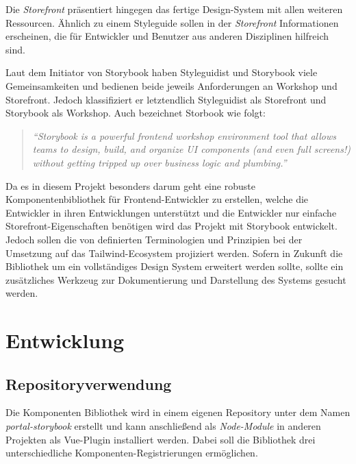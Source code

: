 Die \textit{Storefront} präsentiert hingegen das fertige Design-System mit allen weiteren Ressourcen. Ähnlich zu einem Styleguide sollen in der \textit{Storefront} Informationen erscheinen, die für Entwickler und Benutzer aus anderen Disziplinen hilfreich sind.

Laut \cite{StorybookVSStyleguidist} dem Initiator von Storybook haben Styleguidist und Storybook viele Gemeinsamkeiten und bedienen beide jeweils Anforderungen an Workshop und Storefront. Jedoch klassifiziert er letztendlich Styleguidist als Storefront und Storybook als Workshop. Auch \cite{FrostCite} bezeichnet Storbook wie folgt:
\begin{quotation}
    \emph{``Storybook is a powerful frontend workshop environment tool that allows teams to design, build, and organize UI components (and even full screens!) without getting tripped up over business logic and plumbing.''}
\end{quotation}
Da es in diesem Projekt besonders darum geht eine robuste Komponentenbibliothek für Frontend-Entwickler zu erstellen, welche die Entwickler in ihren Entwicklungen unterstützt und die Entwickler nur einfache Storefront-Eigenschaften benötigen wird das Projekt mit Storybook entwickelt. Jedoch sollen die von \citep{VueDesignSystemTerminology} definierten Terminologien und Prinzipien bei der Umsetzung auf das Tailwind-Ecosystem projiziert werden. Sofern in Zukunft die Bibliothek um ein vollständiges Design System erweitert werden sollte, sollte ein zusätzliches Werkzeug zur Dokumentierung und Darstellung des Systems gesucht werden.

\section{Entwicklung}
\subsection{Repositoryverwendung}
Die Komponenten Bibliothek wird in einem eigenen Repository unter dem Namen \textit{portal-storybook} erstellt und kann anschließend als \textit{Node-Module} in anderen Projekten als Vue-Plugin installiert werden. Dabei soll die Bibliothek drei unterschiedliche Komponenten-Registrierungen ermöglichen.

